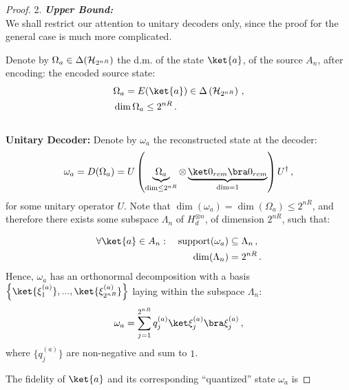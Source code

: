 \documentclass[12pt,a4paper]{article}
\begin{document}
\begin{proof}
2. \textbf{\emph{Upper Bound:}}\\
        We shall restrict our attention to unitary decoders only, since the
        proof for the general case is much more complicated.  

        Denote by $\Omega_a \in \Delta(\mathcal{H}_{2^{nR}})$ the d.m. of the
        state $\ket{a}$, of the source $A_n$, after encoding:
        the encoded source state:
        \begin{align*}
            &\Omega_a = E(\ket{a}) \in \Delta \left( \cH_{2^{nR}} \right)
            \,, \\
            &\dim \Omega_a \leq 2^{nR} \,.
        \end{align*}
\\
\textbf{Unitary Decoder:}
        Denote by $\omega_a$ the reconstructed state at the decoder:
        \begin{align*}
            \omega_a = D(\Omega_a) = U \left( \underbrace{\Omega_a}_{\dim \leq 2^{nR}} \otimes \underbrace{\ketbra{0_{rem}}}_{\dim = 1} \right)
            U^\dagger \,,
        \end{align*}
        for some unitary operator $U$. Note that $\dim(\omega_a) =
        \dim(\Omega_a) \leq 2^{nR}$, and therefore there exists some
        subspace $\Lambda_n$ of $H_d^{\otimes n}$, of dimension $2^{nR}$,
        such that:

        \begin{align*}
            \forall \ket{a} \in A_n: \quad \text{support} (\omega_a) &\subseteq
            \Lambda_n \,, \\
            \dim(\Lambda_n) &= 2^{nR} \,.
        \end{align*}
        Hence, $\omega_a$ has an orthonormal decomposition with a basis
        $\left\{ \ket{\xi_1^{(a)}}, ..., \ket{\xi_{2^{nR}}^{(a)}} \right\}$
        laying within the subspace $\Lambda_n$:
        \begin{align*}
            \omega_a = \sum_{j=1}^{2^{nR}} q_j^{(a)} \ketbra{\xi_j^{(a)}} \,,
        \end{align*}
        where $\{q_j^{(a)}\}$ are non-negative and sum to $1$.

        The fidelity of $\ket{a}$ and its corresponding ``quantized'' state
        $\omega_a$ is


\end{proof}
\end{document}
